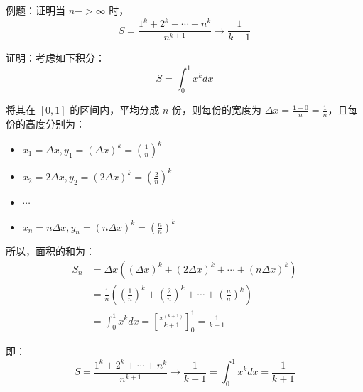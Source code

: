 \documentclass[12pt]{article}
\begin{document}
\begin{framed}  
\small{
例题：证明当 $n->\infty$ 时，
$$
S = \frac{1^k + 2^k + \cdots + n^k}{n^{k+1}} \rightarrow \frac{1}{k+1}
$$

证明：考虑如下积分：
$$
S = \int_0^1x^kdx
$$

将其在 $[0,1]$ 的区间内，平均分成 $n$ 份，则每份的宽度为 $\Delta x = \frac{1-0}{n} = \frac{1}{n}$，且每份的高度分别为：
\begin{itemize}
    \item $x_1 = \Delta x, y_1 = (\Delta x)^k = (\frac{1}{n})^k$
    \item $x_2 = 2\Delta x, y_2 = (2\Delta x)^k = (\frac{2}{n})^k$
    \item $\cdots$
    \item $x_n = n\Delta x, y_n = (n\Delta x)^k = (\frac{n}{n})^k$
\end{itemize}

所以，面积的和为：
\begin{align}
   S_n &= \Delta x((\Delta x)^k + (2\Delta x)^k + \cdots + (n\Delta x)^k) \\
   &= \frac{1}{n}((\frac{1}{n})^k + (\frac{2}{n})^k + \cdots + (\frac{n}{n})^k) \\
   &= \int_0^1x^kdx = [\frac{x^(k+1)}{k+1}]_0^1 = \frac{1}{k+1}
\end{align}

即：
$$
S = \frac{1^k + 2^k + \cdots + n^k}{n^{k+1}} \rightarrow \frac{1}{k+1} = \int_0^1x^kdx = \frac{1}{k+1}
$$
}
\end{framed}
\end{document}
